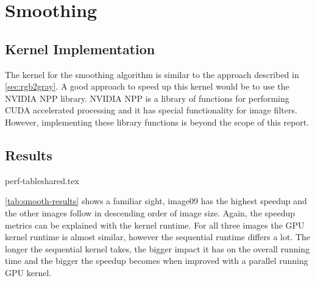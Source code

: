 \documentclass[final]{report}
\begin{document}
\chapter{Smoothing}

\section{Kernel Implementation}
The kernel for the smoothing algorithm is similar to the approach described in \cref{sec:rgb2gray}.
A good approach to speed up this kernel would be to use the NVIDIA NPP library.
NVIDIA NPP is a library of functions for performing CUDA accelerated processing and it has special functionality for image filters.
However, implementing these library functions is beyond the scope of this report.

\section{Results}
{perf-tableshared.tex}

\cref{tab:smooth-results} shows a familiar sight, image09 has the highest speedup and the other images follow in descending order of image size.
Again, the speedup metrics can be explained with the kernel runtime.
For all three images the GPU kernel runtime is almost similar, however the sequential runtime differs a lot.
The longer the sequential kernel takes, the bigger impact it has on the overall running time and the bigger the speedup becomes when improved with a parallel running GPU kernel.

\end{document}
